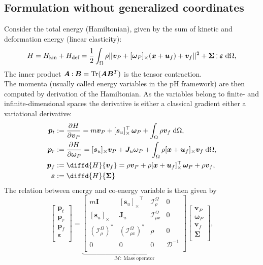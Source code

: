 \documentclass{svjour3}                     %
\DeclareMathOperator{\Tr}{Tr}
\newcommand{\crmat}[1]{\ensuremath{[#1]_{\times}}}
\def\onedot{$\mathsurround0pt\ldotp$}
\def\cddot{%
	\mathbin{\vcenter{\baselineskip.67ex
			\hbox{\onedot}\hbox{\onedot}}%
}}
\begin{document}
\subsection{Formulation without generalized coordinates}
Consider the total energy (Hamiltonian), given by the sum of kinetic and deformation energy (linear elasticity):
\begin{equation}
\begin{aligned}
H = H_{\text{kin}} + H_{\text{def}} = \frac{1}{2} \int_{\Omega} \rho ||\bm{v}_P + \crmat{\bm{\omega}_P} (\bm{x}+\bm{u}_f) + {\bm{v}}_f||^2 + \bm\Sigma \cddot \bm\varepsilon  \d{\Omega},
\end{aligned}
\end{equation}
The inner product $\bm{A} \cddot \bm{B} = \Tr(\bm{A} \bm{B}^T)$ is the tensor contraction. \\  
The momenta (usually called energy variables in the pH framework) are then computed by derivation of the Hamiltonian. As the variables belong to finite- and infinite-dimensional spaces the derivative is either a classical gradient either a variational derivative:
\begin{equation}
\label{eq:momenta}
\begin{aligned}
\bm{p}_t &:= \diffp{H}{\bm{v}_P} = m \bm{v}_P + \crmat{\bm{s}_u}^\top \, \bm\omega_P + \int_{\Omega} \rho \bm{v}_f \d{\Omega}, \\
\bm{p}_r &:= \diffp{H}{\bm\omega_P} = \crmat{\bm{s}_u} \bm{v}_P + \bm{J}_u \bm\omega_P + \int_{\Omega} \rho \crmat{\bm{x}+\bm{u}_f} \bm{v}_f \d{\Omega}, \\
\bm{p}_f &:= \diffd{H}{\bm{v}_f} = \rho \bm{v}_P + \rho \crmat{\bm{x}+\bm{u}_f}^\top \, \bm\omega_P + \rho \bm{v}_f, \\
\bm\varepsilon &:= \diffd{H}{\bm\Sigma}
\end{aligned}
\end{equation}
The relation between energy and co-energy variable is then given by
\begin{equation}
\label{eq:mass_op}
\begin{bmatrix}
\bm{p}_t \\ \bm{p}_r \\ \bm{p}_f \\ \bm\varepsilon \\
\end{bmatrix} = 
\underbrace{\begin{bmatrix}
	m \bm{I} & \crmat{\bm{s}_u}^\top & \mathcal{I}_\rho^{\Omega} & 0 \\
	\crmat{\bm{s}_u} & \bm{J}_u & \bm{\mathcal{I}}_{\rho x}^{\Omega} & 0  \\
	(\mathcal{I}_\rho^{\Omega})^* & (\bm{\mathcal{I}}_{\rho x}^{\Omega})^* & \rho & 0  \\
	0 & 0 & 0 & \bm{\mathcal{D}}^{-1} \\
	\end{bmatrix}}_{\bm{\mathcal{M}}: \; \text{Mass operator}}
\begin{bmatrix}
\bm{v}_P \\ \bm{\omega}_P  \\ \bm{v}_f  \\ \bm\Sigma \\
\end{bmatrix},
\end{equation}
\end{document}

